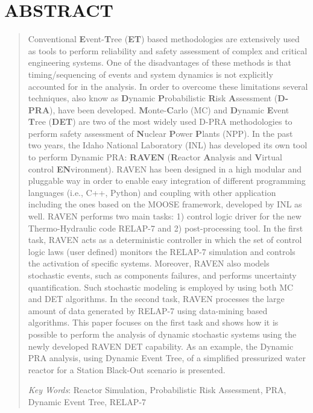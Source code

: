 \documentclass{mc2013}
\begin{document}
\section*{ABSTRACT} 
\begin{quote}
\begin{small}
Conventional \textbf{E}vent-\textbf{T}ree (\textbf{ET}) based methodologies are extensively used as tools to perform reliability and safety assessment of complex and critical engineering systems. 
One of the disadvantages of these methods is that timing/sequencing of events and system dynamics is not explicitly accounted for in the analysis.
In order to overcome these limitations several techniques, also know as \textbf{D}ynamic \textbf{P}robabilistic \textbf{R}isk \textbf{A}ssessment (\textbf{D-PRA}), have been developed. \textbf{M}onte-\textbf{C}arlo (MC) and \textbf{D}ynamic \textbf{E}vent \textbf{T}ree (\textbf{DET}) are two of the most widely used D-PRA methodologies to perform safety assessment of \textbf{N}uclear \textbf{P}ower \textbf{P}lants (NPP).
In the past two years, the Idaho National Laboratory (INL) has developed its own tool to perform Dynamic PRA: \textbf{RAVEN} (\textbf{R}eactor \textbf{A}nalysis and \textbf{V}irtual control \textbf{EN}vironment).
RAVEN has been designed in a high modular and pluggable way in order to enable easy integration of different programming languages (i.e., C++, Python) and coupling with other application including the ones based on the MOOSE framework, developed by INL as well.
RAVEN performs two main tasks: 1) control logic driver for the new Thermo-Hydraulic code RELAP-7 and 2) post-processing tool.
In the first task, RAVEN acts as a deterministic controller in which the set of control logic laws (user defined) monitors the RELAP-7 simulation and controls the activation of specific systems.
Moreover, RAVEN also models stochastic events, such as components failures, and performs uncertainty quantification. Such stochastic modeling is employed by using both MC and DET algorithms.
In the second task, RAVEN processes the large amount of data generated by RELAP-7 using data-mining based algorithms.
This paper focuses on the first task and shows how it is possible to perform the analysis of dynamic stochastic systems using the newly developed RAVEN DET capability.
As an example, the Dynamic PRA analysis, using Dynamic Event Tree, of a simplified pressurized water reactor for a Station Black-Out scenario is presented.

\emph{Key Words}: Reactor Simulation, Probabilistic Risk Assessment, PRA, Dynamic Event Tree, RELAP-7 %
\end{small} 
\end{quote}
\end{document}

